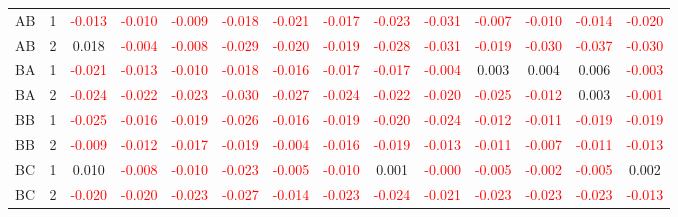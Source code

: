 \begin{table}[!htb]
{\begin{tabular}{llcccccccccccc}
AB & 1 & \textcolor{red}{-0.013} & \textcolor{red}{-0.010} & \textcolor{red}{-0.009} & \textcolor{red}{-0.018} & \textcolor{red}{-0.021} & \textcolor{red}{-0.017} & \textcolor{red}{-0.023} & \textcolor{red}{-0.031} & \textcolor{red}{-0.007} & \textcolor{red}{-0.010} & \textcolor{red}{-0.014} & \textcolor{red}{-0.020}\\
AB & 2 & 0.018 & \textcolor{red}{-0.004} & \textcolor{red}{-0.008} & \textcolor{red}{-0.029} & \textcolor{red}{-0.020} & \textcolor{red}{-0.019} & \textcolor{red}{-0.028} & \textcolor{red}{-0.031} & \textcolor{red}{-0.019} & \textcolor{red}{-0.030} & \textcolor{red}{-0.037} & \textcolor{red}{-0.030}\\
BA & 1 & \textcolor{red}{-0.021} & \textcolor{red}{-0.013} & \textcolor{red}{-0.010} & \textcolor{red}{-0.018} & \textcolor{red}{-0.016} & \textcolor{red}{-0.017} & \textcolor{red}{-0.017} & \textcolor{red}{-0.004} & 0.003 & 0.004 & 0.006 & \textcolor{red}{-0.003}\\
BA & 2 & \textcolor{red}{-0.024} & \textcolor{red}{-0.022} & \textcolor{red}{-0.023} & \textcolor{red}{-0.030} & \textcolor{red}{-0.027} & \textcolor{red}{-0.024} & \textcolor{red}{-0.022} & \textcolor{red}{-0.020} & \textcolor{red}{-0.025} & \textcolor{red}{-0.012} & 0.003 & \textcolor{red}{-0.001}\\
BB & 1 & \textcolor{red}{-0.025} & \textcolor{red}{-0.016} & \textcolor{red}{-0.019} & \textcolor{red}{-0.026} & \textcolor{red}{-0.016} & \textcolor{red}{-0.019} & \textcolor{red}{-0.020} & \textcolor{red}{-0.024} & \textcolor{red}{-0.012} & \textcolor{red}{-0.011} & \textcolor{red}{-0.019} & \textcolor{red}{-0.019}\\
BB & 2 & \textcolor{red}{-0.009} & \textcolor{red}{-0.012} & \textcolor{red}{-0.017} & \textcolor{red}{-0.019} & \textcolor{red}{-0.004} & \textcolor{red}{-0.016} & \textcolor{red}{-0.019} & \textcolor{red}{-0.013} & \textcolor{red}{-0.011} & \textcolor{red}{-0.007} & \textcolor{red}{-0.011} & \textcolor{red}{-0.013}\\
BC & 1 & 0.010 & \textcolor{red}{-0.008} & \textcolor{red}{-0.010} & \textcolor{red}{-0.023} & \textcolor{red}{-0.005} & \textcolor{red}{-0.010} & 0.001 & \textcolor{red}{-0.000} & \textcolor{red}{-0.005} & \textcolor{red}{-0.002} & \textcolor{red}{-0.005} & 0.002\\
BC & 2 & \textcolor{red}{-0.020} & \textcolor{red}{-0.020} & \textcolor{red}{-0.023} & \textcolor{red}{-0.027} & \textcolor{red}{-0.014} & \textcolor{red}{-0.023} & \textcolor{red}{-0.024} & \textcolor{red}{-0.021} & \textcolor{red}{-0.023} & \textcolor{red}{-0.023} & \textcolor{red}{-0.023} & \textcolor{red}{-0.013}\\

\end{tabular}}
\end{table}
